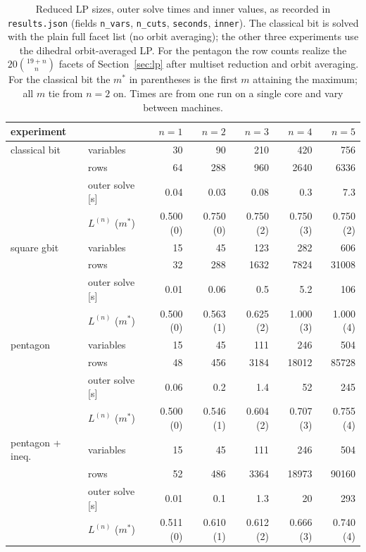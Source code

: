 \documentclass[11pt,a4paper]{article}
\newcommand*{\code}[1]{\texttt{#1}}
\theoremstyle{remark}
\begin{document}
\begin{table}[ht]\centering\small
\begin{tabular}{llrrrrr}
\toprule
experiment & & $n=1$ & $n=2$ & $n=3$ & $n=4$ & $n=5$\\
\midrule
classical bit
 & variables            & 30 & 90 & 210 & 420 & 756\\
 & rows                 & 64 & 288 & 960 & 2640 & 6336\\
 & outer solve [s]      & 0.04 & 0.03 & 0.08 & 0.3 & 7.3\\
 & $L^{(n)}$ ($m^*$)    & 0.500 (0) & 0.750 (0) & 0.750 (2) & 0.750 (3) & 0.750 (2)\\
\midrule
square gbit
 & variables            & 15 & 45 & 123 & 282 & 606\\
 & rows                 & 32 & 288 & 1632 & 7824 & 31008\\
 & outer solve [s]      & 0.01 & 0.06 & 0.5 & 5.2 & 106\\
 & $L^{(n)}$ ($m^*$)    & 0.500 (0) & 0.563 (1) & 0.625 (2) & 1.000 (3) & 1.000 (4)\\
\midrule
pentagon
 & variables            & 15 & 45 & 111 & 246 & 504\\
 & rows                 & 48 & 456 & 3184 & 18012 & 85728\\
 & outer solve [s]      & 0.06 & 0.2 & 1.4 & 52 & 245\\
 & $L^{(n)}$ ($m^*$)    & 0.500 (0) & 0.546 (1) & 0.604 (2) & 0.707 (3) & 0.755 (4)\\
\midrule
pentagon + ineq.
 & variables            & 15 & 45 & 111 & 246 & 504\\
 & rows                 & 52 & 486 & 3364 & 18973 & 90160\\
 & outer solve [s]      & 0.01 & 0.1 & 1.3 & 20 & 293\\
 & $L^{(n)}$ ($m^*$)    & 0.511 (0) & 0.610 (1) & 0.612 (2) & 0.666 (3) & 0.740 (4)\\
\bottomrule
\end{tabular}
\caption{Reduced LP sizes, outer solve times and inner values,
as recorded in \code{results.json} (fields \code{n\_vars}, \code{n\_cuts},
\code{seconds}, \code{inner}). The classical bit is solved with the plain
full facet list (no orbit averaging); the other three experiments use the
dihedral orbit-averaged LP. For the pentagon the row counts realize the
$20\binom{19+n}{n}$ facets of Section~\ref{sec:lp} after multiset
reduction and orbit averaging. For the classical bit the $m^*$ in
parentheses is the first $m$ attaining the maximum; all $m$ tie from $n=2$
on. Times are from one run on a single core and vary between machines.}
\label{tab:sizes}
\end{table}
\end{document}
